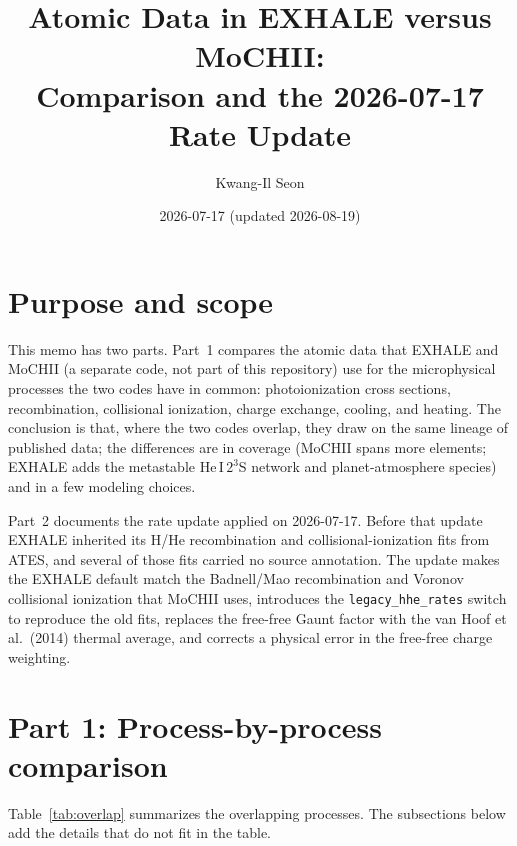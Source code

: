\documentclass[english,a4paper]{my_memo}
\newcommand{\code}[1]{\texttt{#1}}
\begin{document}
\title{Atomic Data in EXHALE versus MoCHII:\\
Comparison and the 2026-07-17 Rate Update}
\author{Kwang-Il Seon}
\date{2026-07-17 (updated 2026-08-19)}
\maketitle

\tableofcontents
\bigskip

\section{Purpose and scope}

This memo has two parts. Part~1 compares the atomic data that EXHALE and
MoCHII (a separate code, not part of this repository) use for the microphysical
processes the two codes have in common: photoionization cross sections,
recombination, collisional ionization, charge exchange, cooling, and
heating. The conclusion is that, where the two codes overlap, they draw on
the same lineage of published data; the differences are in coverage
(MoCHII spans more elements; EXHALE adds the metastable He\,I\,$2^3$S
network and planet-atmosphere species) and in a few modeling choices.

Part~2 documents the rate update applied on 2026-07-17. Before that update
EXHALE inherited its H/He recombination and collisional-ionization fits
from ATES, and several of those fits carried no source annotation. The
update makes the EXHALE default match the Badnell/Mao recombination and
Voronov collisional ionization that MoCHII uses, introduces the
\code{legacy\_hhe\_rates} switch to reproduce the old fits, replaces the
free-free Gaunt factor with the van Hoof et al.\ (2014) thermal average,
and corrects a physical error in the free-free charge weighting.

\section{Part 1: Process-by-process comparison}

Table~\ref{tab:overlap} summarizes the overlapping processes. The
subsections below add the details that do not fit in the table.
\end{document}
